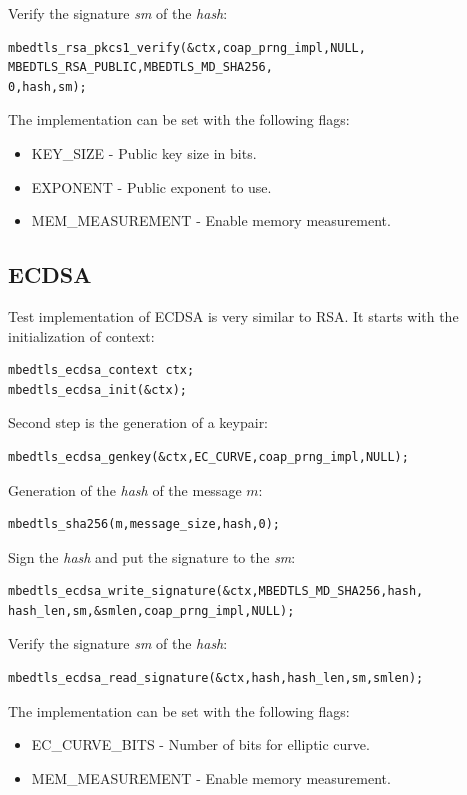 \documentclass[thesis=M,english]{FITthesis}[2019/12/23]
\begin{document}
\noindent
Verify the signature \textit{sm} of the \textit{hash}:
\begin{lstlisting}[frame=single]
mbedtls_rsa_pkcs1_verify(&ctx,coap_prng_impl,NULL,
MBEDTLS_RSA_PUBLIC,MBEDTLS_MD_SHA256,
0,hash,sm);
\end{lstlisting}

\bigskip
\noindent
The implementation can be set with the following flags:
\begin{itemize}
\item	KEY\_SIZE - Public key size in bits.
\item EXPONENT - Public exponent to use.
\item MEM\_MEASUREMENT - Enable memory measurement.
\end{itemize}

\subsection{ECDSA}
Test implementation of ECDSA is very similar to RSA. It starts with the initialization of context:
\begin{lstlisting}[frame=single]
mbedtls_ecdsa_context ctx;
mbedtls_ecdsa_init(&ctx);
\end{lstlisting}

\noindent
Second step is the generation of a keypair:
\begin{lstlisting}[frame=single]
mbedtls_ecdsa_genkey(&ctx,EC_CURVE,coap_prng_impl,NULL);
\end{lstlisting}

\noindent
Generation of the \textit{hash} of the message $m$:
\begin{lstlisting}[frame=single]
mbedtls_sha256(m,message_size,hash,0);
\end{lstlisting}

\noindent
Sign the \textit{hash} and put the signature to the \textit{sm}:
\begin{lstlisting}[frame=single]
mbedtls_ecdsa_write_signature(&ctx,MBEDTLS_MD_SHA256,hash,
hash_len,sm,&smlen,coap_prng_impl,NULL);
\end{lstlisting}

\noindent
Verify the signature \textit{sm} of the \textit{hash}:
\begin{lstlisting}[frame=single]
mbedtls_ecdsa_read_signature(&ctx,hash,hash_len,sm,smlen);
\end{lstlisting}

\bigskip
\noindent
The implementation can be set with the following flags:
\begin{itemize}
\item	EC\_CURVE\_BITS - Number of bits for elliptic curve.
\item MEM\_MEASUREMENT - Enable memory measurement.
\end{itemize}
\end{document}
